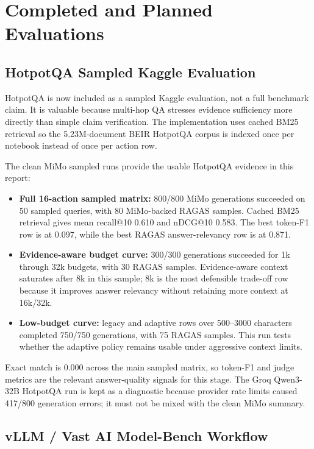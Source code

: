 \section{Completed and Planned Evaluations}

\subsection{HotpotQA Sampled Kaggle Evaluation}

HotpotQA is now included as a sampled Kaggle evaluation, not a full benchmark claim. It is valuable because multi-hop QA stresses evidence sufficiency more directly than simple claim verification. The implementation uses cached BM25 retrieval so the 5.23M-document BEIR HotpotQA corpus is indexed once per notebook instead of once per action row.

The clean MiMo sampled runs provide the usable HotpotQA evidence in this report:

\begin{itemize}[leftmargin=*]
  \item \textbf{Full 16-action sampled matrix:} 800/800 MiMo generations succeeded on 50 sampled queries, with 80 MiMo-backed RAGAS samples. Cached BM25 retrieval gives mean recall@10 0.610 and nDCG@10 0.583. The best token-F1 row is  at 0.097, while the best RAGAS answer-relevancy row is  at 0.871.
  \item \textbf{Evidence-aware budget curve:} 300/300 generations succeeded for 1k through 32k budgets, with 30 RAGAS samples. Evidence-aware context saturates after 8k in this sample; 8k is the most defensible trade-off row because it improves answer relevancy without retaining more context at 16k/32k.
  \item \textbf{Low-budget curve:} legacy and adaptive rows over 500--3000 characters completed 750/750 generations, with 75 RAGAS samples. This run tests whether the adaptive policy remains usable under aggressive context limits.
\end{itemize}

Exact match is 0.000 across the main sampled matrix, so token-F1 and judge metrics are the relevant answer-quality signals for this stage. The Groq Qwen3-32B HotpotQA run is kept as a diagnostic because provider rate limits caused 417/800 generation errors; it must not be mixed with the clean MiMo summary.

\subsection{vLLM / Vast AI Model-Bench Workflow}

